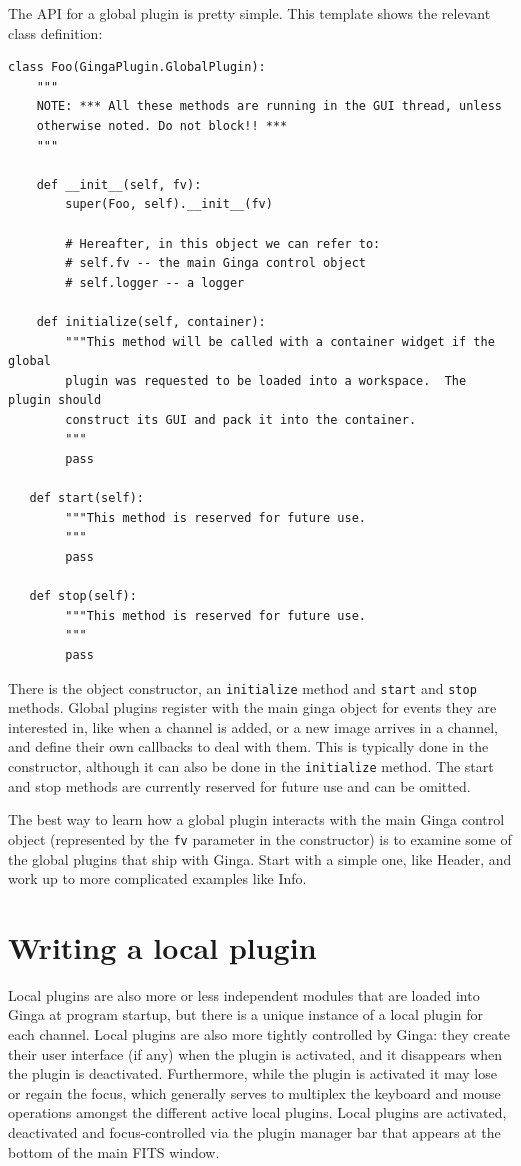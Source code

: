 \documentclass[11pt]{report}
\begin{document}
The API for a global plugin is pretty simple.  This template shows the
relevant class definition:
\begin{lstlisting}
class Foo(GingaPlugin.GlobalPlugin):
    """
    NOTE: *** All these methods are running in the GUI thread, unless
    otherwise noted. Do not block!! ***  
    """

    def __init__(self, fv):
        super(Foo, self).__init__(fv)

        # Hereafter, in this object we can refer to:
        # self.fv -- the main Ginga control object
        # self.logger -- a logger

    def initialize(self, container):
        """This method will be called with a container widget if the global
        plugin was requested to be loaded into a workspace.  The plugin should
        construct its GUI and pack it into the container.
        """
        pass

   def start(self):
        """This method is reserved for future use.
        """
        pass

   def stop(self):
        """This method is reserved for future use.
        """
        pass
\end{lstlisting}
There is the object constructor, an {\tt initialize} method and 
{\tt start} and {\tt stop} methods.  
Global plugins register with the main ginga object for events they
are interested in, like when a channel is added, or a new image arrives
in a channel, and define their own callbacks to deal with them.  This is
typically done in the constructor, although it can also be done in the
{\tt initialize} method.  The start and stop methods are currently 
reserved for future use and can be omitted. 

The best way to learn how a global plugin interacts with the main Ginga
control object (represented by the {\tt fv} parameter in the
constructor) is to examine some of the global plugins that ship with
Ginga.  Start with a simple one, like Header, and work up to more
complicated examples like Info.

\section{Writing a local plugin}
\label{sec:localplugins}
Local plugins are also more or less independent modules that are loaded
into Ginga at program startup, but there is a unique instance of a local
plugin for each channel.  Local plugins are also more tightly controlled
by Ginga: they create their user interface (if any) when the plugin
is activated, and it disappears when the plugin is deactivated.
Furthermore, while the plugin is activated it may lose or regain the
focus, which generally serves to multiplex the keyboard and mouse
operations amongst the different active local plugins.  
Local plugins are activated, deactivated and focus-controlled via the 
plugin manager bar that appears at the bottom of the main FITS window.
\end{document}
